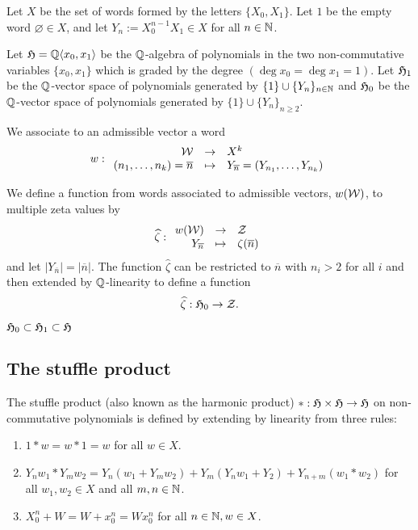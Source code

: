 \begin{defn}[Words]\label{def:word}
Let $X$ be the set of words formed by the letters $\{X_0, X_1\}$. Let $1$ be the empty word $\varnothing \in X$, and let $Y_n := X_0^{n-1}X_1 \in X$ for all $n \in \mathbb{N}$. 
\end{defn}
\begin{defn}
Let $\mathfrak{H} = \mathbb{Q}\langle x_0, x_1 \rangle$ be the $\mathbb{Q}$-algebra of polynomials in the two non-commutative variables $\{ x_0, x_1 \}$ which is graded by the degree $(\deg x_0 = \deg x_1 = 1)$. Let $\mathfrak{H}_1$ be the $\mathbb{Q}$-vector space of polynomials generated by $\{1\} \cup \{Y_n\}_{n \in \mathbb{N}}$ and $\mathfrak{H}_0$ be the $\mathbb{Q}$-vector space of polynomials generated by $\{1\} \cup \{Y_n\}_{n \geq 2}$.
\end{defn}
\begin{defn}\label{def:assocword}
We associate to an admissible vector a word
\[
w : \begin{array}{rcl}
\mathcal{W} & \to & X^k \\
(n_1, \ldots, n_k) = \overline{n} & \mapsto & Y_{\overline{n}} = (Y_{n_1}, \ldots, Y_{n_k})
\end{array}
\]
\end{defn}
\begin{defn}
We define a function from words associated to admissible vectors, $w(\mathcal{W})$, to multiple zeta values by
\[
\widehat{\zeta} : \begin{array}{rcl}
w(\mathcal{W}) & \to & \mathcal{Z} \\
Y_{\overline{n}} & \mapsto & \zeta(\overline{n})
\end{array}
\]
and let $|Y_{\overline{n}}| = |\overline{n}|$. The function $\widehat{\zeta}$ can be restricted to $\overline{n}$ with $n_i > 2$ for all $i$ and then extended by $\mathbb{Q}$-linearity to define a function
\[
\widehat{\zeta} : \mathfrak{H}_0 \to \mathcal{Z}.
\]
\end{defn}
\begin{rem}
$\mathfrak{H}_0 \subset \mathfrak{H}_1 \subset \mathfrak{H}$
\end{rem}

\subsection{The stuffle product}

\begin{defn}
The stuffle product (also known as the harmonic product) $* : \mathfrak{H} \times \mathfrak{H} \to \mathfrak{H}$ on non-commutative polynomials is defined by extending by linearity from three rules:
\begin{enumerate}
\item $1 * w = w * 1 = w$ for all $w \in X$.
\item $Y_n w_1 * Y_m w_2 = Y_n(w_1 + Y_m w_2) + Y_m(Y_n w_1 + Y_2) + Y_{n+m}(w_1*w_2)$ for all $w_1, w_2 \in X$ and all $m, n \in \mathbb{N}$.
\item $X_0^n + W = W + x_0^n = W x_0^n$ for all $n \in \mathbb{N}, w \in X$.
\end{enumerate}
\end{defn}

